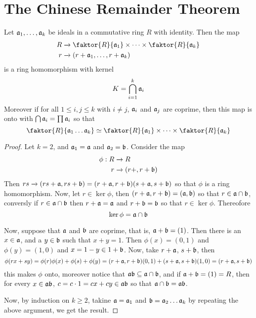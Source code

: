 \section{The Chinese Remainder Theorem}

\begin{theorem}\label{5.7.1}
  Let $\af_1, \dots, \af_k$ be ideals in a commutative ring $R$ with identity.
  Then the map
  \begin{align*}
    R   &   \xrightarrow{} \faktor{R}{\af_1} \times \dots \times
    \faktor{R}{\af_k} \\
    r   &   \xrightarrow{} (r+\af_1, \dots, r+\af_k)    \\
  \end{align*}
  is a ring homomorphism with kernel
  \begin{equation*}
    K=\bigcap_{i=1}^k{\af_i}
  \end{equation*}
  Moreover if for all $1 \leq i,j \leq k$ with  $i \neq j$,  $\af_i$ and  $\af_j$
  are coprime, then this map is onto with  $\bigcap{\af_i}=\prod{\af_i}$ so that
  \begin{equation*}
    \faktor{R}{\af_1 \dots \af_k} \simeq \faktor{R}{\af_1} \times \dots \times
    \faktor{R}{\af_k}
  \end{equation*}
\end{theorem}
\begin{proof}
  Let $k=2$, and  $\af_1=\af$ and $\af_2=\bf$. Consider the map
  \begin{align*}
    \phi:R  &   \xrightarrow{} R  \\
    r   &   \xrightarrow{}  (r+,r+\bf)   \\
  \end{align*}
  Then $rs \xrightarrow{} (rs+\af,rs+\bf)=(r+\af,r+\bf)(s+\af,s+\bf)$ so that $\phi$ is a
  ring homomorphism. Now, let  $r \in \ker{\phi}$, then $(r+\af,r+\bf)=(\af,\bf)$ so
  that $r \in \af \cap \bf$, conversly if  $r \in \af \cap \bf$ then  $r+\af=\af$ and
  $r+\bf=\bf$ so that  $r \in \ker{\phi}$. Thereofore
  \begin{equation*}
    \ker{\phi}=\af \cap \bf
  \end{equation*}

  Now, suppose that $\af$ and  $\bf$ are coprime, that is, $\af+\bf=(1)$. Then there
  is an  $x \in \af$, and a  $y \in \bf$ such that  $x+y=1$. Then $\phi(x)=(0,1)$
  and $\phi(y)=(1,0)$ and $x=1-y \in 1+\bf$. Now, take  $r+\af$,  $s+\bf$, then
  \begin{equation*}
    \phi(rx+sy)=\phi(r)\phi(x)+\phi(s)+\phi(y)=(r+\af,r+\bf)(0,1)+(s+\af,s+\bf)(1,0)
    =(r+\af,s+\bf)
  \end{equation*}
  this makes $\phi$ onto, moreover notice that  $\af\bf \subseteq \af \cap \bf$, and
  if  $\af+\bf=(1)=R$, then for every $x \in \af\bf$,  $c=c \cdot 1=cx+cy \in \af\bf$ so
  that  $\af \cap \bf=\af\bf$.

  Now, by induction on $k \geq 2$, takine  $\af=\af_1$ and $\bf=\af_2 \dots \af_k$ by
  repeating the above argument, we get the result.
\end{proof}
